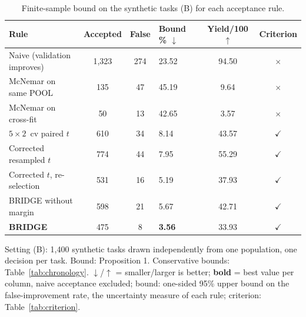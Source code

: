 \begin{table}[!t]
\centering
\scriptsize
{}
\setlength{\tabcolsep}{2.5pt}
\caption{Finite-sample bound on the synthetic tasks (B) for each acceptance rule.}
\label{tab:synthetic}
\setlength{\tymin}{28pt}\begin{tabulary}{\columnwidth}{@{}lccLcc@{}}
\toprule
Rule & Accepted & False & Bound \% $\downarrow$ & Yield/100 $\uparrow$ & Criterion \\
\midrule
Naive (validation improves) & 1,323 & 274 & 23.52 & 94.50 & $\times$ \\
McNemar on same POOL & 135 & 47 & 45.19 & 9.64 & $\times$ \\
McNemar on cross-fit & 50 & 13 & 42.65 & 3.57 & $\times$ \\
$5\times2$~cv paired $t$ & 610 & 34 & 8.14 & 43.57 & $\checkmark$ \\
Corrected resampled $t$ & 774 & 44 & 7.95 & 55.29 & $\checkmark$ \\
Corrected $t$, re-selection & 531 & 16 & 5.19 & 37.93 & $\checkmark$ \\
BRIDGE without margin & 598 & 21 & 5.67 & 42.71 & $\checkmark$ \\
\textbf{BRIDGE} & 475 & 8 & \textbf{3.56} & 33.93 & $\checkmark$ \\
\bottomrule
\end{tabulary}

\vspace{2pt}
\parbox{\linewidth}{\justifying\scriptsize *Setting (B): 1,400 synthetic tasks drawn independently from one population, one decision per task. Bound: Proposition 1. Conservative bounds: Table~\ref{tab:chronology}.  $\downarrow$/$\uparrow$ = smaller/larger is better; \textbf{bold} = best value per column, naive acceptance excluded; bound: one-sided 95\% upper bound on the false-improvement rate, the uncertainty measure of each rule; criterion: Table~\ref{tab:criterion}.}
\end{table}

